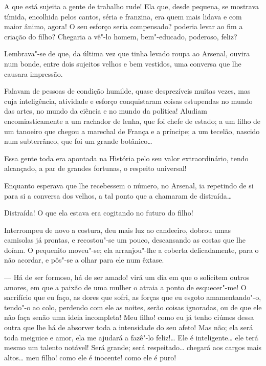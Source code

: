 A que está sujeita a gente de trabalho rude! Ela que, desde pequena, se
mostrava tímida, encolhida pelos cantos, séria e franzina, era quem mais
lidava e com maior ânimo, agora! O seu esforço seria compensado? poderia
levar ao fim a criação do filho? Chegaria a vê"-lo homem, bem"-educado,
poderoso, feliz?

Lembrava"-se de que, da última vez que tinha levado roupa ao Arsenal,
ouvira num bonde, entre dois sujeitos velhos e bem vestidos, uma
conversa que lhe causara impressão.

Falavam de pessoas de condição humilde, quase desprezíveis muitas vezes,
mas cuja inteligência, atividade e esforço conquistaram coisas
estupendas no mundo das artes, no mundo da ciência e no mundo da
política! Aludiam encomiasticamente a um rachador de lenha, que foi
chefe de estado; a um filho de um tanoeiro que chegou a marechal de
França e a príncipe; a um tecelão, nascido num subterrâneo, que foi um
grande botânico\ldots{}

Essa gente toda era apontada na História pelo seu valor extraordinário,
tendo alcançado, a par de grandes fortunas, o respeito universal!

Enquanto esperava que lhe recebessem o número, no Arsenal, ia repetindo
de si para si a conversa dos velhos, a tal ponto que a chamaram de
distraída\ldots{}

Distraída! O que ela estava era cogitando no futuro do filho!

Interrompeu de novo a costura, deu mais luz ao candeeiro, dobrou umas
camisolas já prontas, e recostou"-se um pouco, descansando as costas que
lhe doíam. O pequenito moveu"-se; ela arranjou"-lhe a coberta
delicadamente, para o não acordar, e pôs"-se a olhar para ele num êxtase.

--- Há de ser formoso, há de ser amado! virá um dia em que o solicitem
outros amores, em que a paixão de uma mulher o atraia a ponto de
esquecer"-me! O sacrifício que eu faço, as dores que sofri, as forças que
eu esgoto amamentando"-o, tendo"-o ao colo, perdendo com ele as noites,
serão coisas ignoradas, ou de que ele não faça senão uma ideia
incompleta! Meu filho! como eu já tenho ciúmes dessa outra que lhe há de
absorver toda a intensidade do seu afeto! Mas não; ela será toda
meiguice e amor, ela me ajudará a fazê"-lo feliz!\ldots{} Ele é inteligente\ldots{}
ele terá mesmo um talento notável! Será grande; será respeitado\ldots{}
chegará aos cargos mais altos\ldots{} meu filho! como ele é inocente! como
ele é puro!

